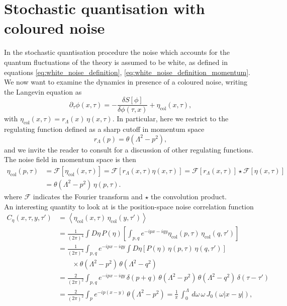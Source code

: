 \section{Stochastic quantisation with coloured noise}
\label{sec:coloured_noise}
In the stochastic quantisation procedure the noise which accounts for the quantum fluctuations of the theory is assumed to be white, as defined in equations \eqref{eq:white_noise_definition}, \eqref{eq:white_noise_definition_momentum}. 
We now want to examine the dynamics in presence of a coloured noise, writing the Langevin equation as
\begin{equation*}
    \partial_\tau \phi(x, \tau) = - \frac{\delta S[\phi]}{\delta \phi (\tau, x)} + \eta_\text{col}(x, \tau),
    \label{eq:Langevin_scalar_regularised}
\end{equation*}
with $\eta_\text{col}(x,\tau) = r_\Lambda(x) \, \eta(x,\tau)$. In particular, here we restrict to the regulating function defined as a sharp cutoff in momentum space
\begin{equation}
    r_\Lambda(p) = \theta(\Lambda^2 - p^2),
    \label{eq:regulator}
\end{equation}
and we invite the reader to consult \cite{Pawlowski2017CoolingNoise} for a discussion of other regulating functions. \\
The noise field in momentum space is then
\begin{equation*}
    \begin{aligned}
        \eta_\text{col}(p, \tau) &= \mathcal{F}[\eta_\text{col}(x,\tau)] = \mathcal{F}[r_\Lambda(x,\tau) \eta(x,\tau)] = \mathcal{F}[r_\Lambda(x,\tau)] \star \mathcal{F}[\eta(x,\tau)] \\
        &= \theta(\Lambda^2 - p^2)  \, \eta(p, \tau).
    \end{aligned}
\end{equation*}
where $\mathcal{F}$ indicates the Fourier transform and $\star$ the convolution product. \\
An interesting quantity to look at is the position-space noise correlation function
\begin{equation}
    \begin{aligned}
        C_{\eta}(x,\tau,y,\tau') &= \left\langle\eta_\text{col}(x,\tau) \, \eta_\text{col}(y,\tau')\right\rangle \\
        &= \frac{1}{(2\pi)^{4}} \int D\eta \, P(\eta) \left[\int_{p,q} e^{-ipx-iqy }\eta_\text{col}(p,\tau) \, \eta_\text{col}(q,\tau')\right] \\
        &= \frac{1}{(2\pi)^{4}} \int_{p,q} e^{-ipx-iqy } \int D\eta \left[ P(\eta) \, \eta(p,\tau) \, \eta(q,\tau') \right] \\
        &\qquad\times \theta(\Lambda^2 - p^2) \, \theta(\Lambda^2 - q^2)  \\
        &= \frac{2}{(2\pi)^{2}} \int_{p,q} e^{-ipx-iqy} \, \delta(p+q) \, \theta(\Lambda^2 - p^2) \, \theta(\Lambda^2 - q^2) \, \delta(\tau - \tau') \\
        &= \frac{2}{(2\pi)^{2}} \int_{p} e^{-ip(x-y)} \, \theta(\Lambda^2 - p^2) = \frac{1}{\pi} \, \int_0^\Lambda \, d\omega \, \omega \, J_0(\omega |x-y|),
    \end{aligned}
    \label{eq:coloured_noise_correlation}
\end{equation}
